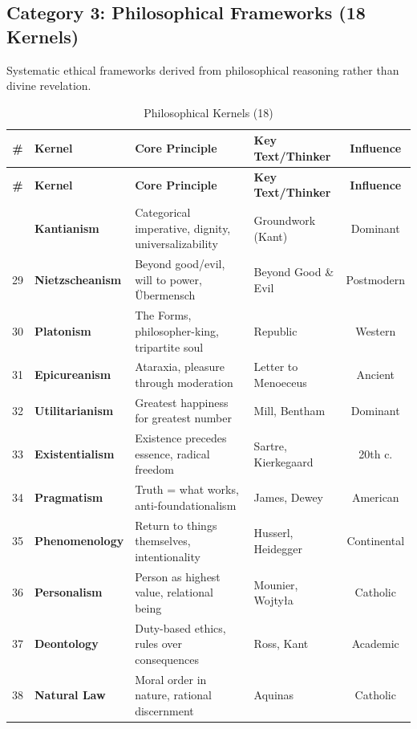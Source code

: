 \documentclass[11pt,a4paper]{article}
\theoremstyle{definition}
\theoremstyle{remark}
\begin{document}
\subsection{Category 3: Philosophical Frameworks (18 Kernels)}

Systematic ethical frameworks derived from philosophical reasoning rather than divine revelation.

\begin{longtable}{@{}clp{4cm}p{3.5cm}c@{}}
\caption{Philosophical Kernels (18)} \label{tab:philosophical-kernels} \\
\toprule
\textbf{\#} & \textbf{Kernel} & \textbf{Core Principle} & \textbf{Key Text/Thinker} & \textbf{Influence} \\
\midrule
\endfirsthead
\toprule
\textbf{\#} & \textbf{Kernel} & \textbf{Core Principle} & \textbf{Key Text/Thinker} & \textbf{Influence} \\
\midrule
\endhead
\bottomrule
\endlastfoot
28 & \textbf{Kantianism} & Categorical imperative, dignity, universalizability & Groundwork (Kant) & Dominant \\
29 & \textbf{Nietzscheanism} & Beyond good/evil, will to power, Übermensch & Beyond Good \& Evil & Postmodern \\
30 & \textbf{Platonism} & The Forms, philosopher-king, tripartite soul & Republic & Western \\
31 & \textbf{Epicureanism} & Ataraxia, pleasure through moderation & Letter to Menoeceus & Ancient \\
32 & \textbf{Utilitarianism} & Greatest happiness for greatest number & Mill, Bentham & Dominant \\
33 & \textbf{Existentialism} & Existence precedes essence, radical freedom & Sartre, Kierkegaard & 20th c. \\
34 & \textbf{Pragmatism} & Truth = what works, anti-foundationalism & James, Dewey & American \\
35 & \textbf{Phenomenology} & Return to things themselves, intentionality & Husserl, Heidegger & Continental \\
36 & \textbf{Personalism} & Person as highest value, relational being & Mounier, Wojtyła & Catholic \\
37 & \textbf{Deontology} & Duty-based ethics, rules over consequences & Ross, Kant & Academic \\
38 & \textbf{Natural Law} & Moral order in nature, rational discernment & Aquinas & Catholic \\

\end{longtable}
\end{document}
